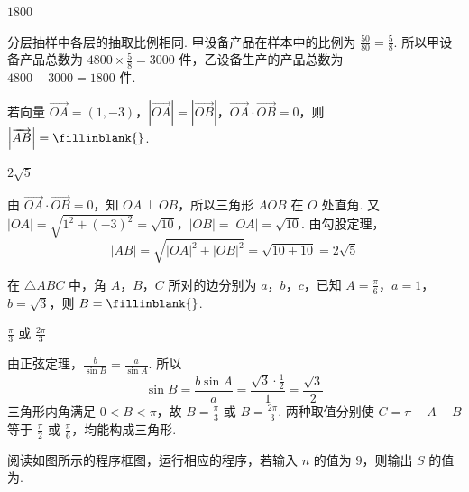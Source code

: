 \begin{answer}
\(1800\)
\end{answer}

\begin{solution}
分层抽样中各层的抽取比例相同. 甲设备产品在样本中的比例为 \(\frac{50}{80}=\frac58\). 所以甲设备产品总数为 \(4800\times\frac58=3000\) 件，乙设备生产的产品总数为 \(4800-3000=1800\text{ 件}\).
\end{solution}

\begin{problem}
若向量 \( \overrightarrow{OA} = (1, -3) \)，\( \left|\overrightarrow{OA}\right| = \left|\overrightarrow{OB}\right| \)，\( \overrightarrow{OA} \cdot \overrightarrow{OB} = 0 \)，则 \( \left|\overrightarrow{AB}\right| =\fillinblank{} \).
\end{problem}

\begin{answer}
\(2\sqrt{5}\)
\end{answer}

\begin{solution}
由 \(\overrightarrow{OA}\cdot\overrightarrow{OB}=0\)，知 \(OA\perp OB\)，所以三角形 \(AOB\) 在 \(O\) 处直角. 又 \(|OA|=\sqrt{1^2+(-3)^2}=\sqrt{10}\)，\(|OB|=|OA|=\sqrt{10}\).
由勾股定理，
\[
|AB|=\sqrt{|OA|^2+|OB|^2}=\sqrt{10+10}=2\sqrt5
\]
\end{solution}

\begin{problem}
在 \(\triangle ABC\) 中，角 \(A\)，\(B\)，\(C\) 所对的边分别为 \(a\)，\(b\)，\(c\)，已知 \(A = \frac{\pi}{6}\)，\(a = 1\)，\(b = \sqrt{3}\)，则 \(B =\fillinblank{} \).
\end{problem}

\begin{answer}
\(\frac{\pi}{3}\) 或 \(\frac{2\pi}{3}\)
\end{answer}

\begin{solution}
由正弦定理，\(\frac{b}{\sin B}=\frac{a}{\sin A}\).
所以
\[
\sin B=\frac{b\sin A}{a}
=\frac{\sqrt3\cdot\frac12}{1}
=\frac{\sqrt3}{2}
\]
三角形内角满足 \(0<B<\pi\)，故 \(B=\frac{\pi}{3}\) 或 \(B=\frac{2\pi}{3}\).
两种取值分别使 \(C=\pi-A-B\) 等于 \(\frac{\pi}{2}\) 或 \(\frac{\pi}{6}\)，均能构成三角形.
\end{solution}

\begin{problem}
阅读如图所示的程序框图，运行相应的程序，若输入 \(n\) 的值为 \(9\)，则输出 \(S\) 的值为\fillinblank{}.

\end{problem}

